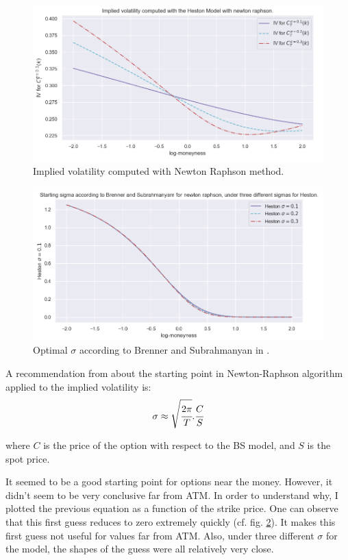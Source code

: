 \begin{figure}
\centering
   \includegraphics[width = 0.75 \textwidth]{../addition_part/images/integration_fft/Heston_NEWTON_IV.png}
   \caption{Implied volatility computed with Newton Raphson method.}
   \label{fig:iv_newton}
\end{figure}

\begin{figure}
\centering
   \includegraphics[width = 0.75 \textwidth]{../addition_part/images/integration_fft/Implied_vol_heston_recommandation.png}
   \caption{Optimal $\sigma$ according to Brenner and Subrahmanyan in \cite{Brenner}.}
   \label{fig:brenner}
\end{figure}


A recommendation from \cite{Brenner} about the starting point in Newton-Raphson algorithm applied to the implied volatility is:
$$
   \sigma \approx \sqrt{\cfrac{2\pi}{T}} . \cfrac{C}{S}
$$

where $C$ is the price of the option with respect to the BS model, and $S$ is the spot price. 

It seemed to be a good starting point for options near the money. 
However, it didn't seem to be very conclusive far from ATM. In order to understand why, I plotted the previous equation as a function of the strike price. One can observe that this first guess reduces to zero extremely quickly (cf. fig. \ref{fig:brenner}). It makes this first guess not useful for values far from ATM. Also, under three different $\sigma$ for the model, the shapes of the guess were all relatively very close.

